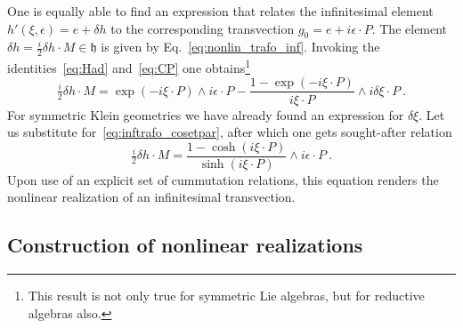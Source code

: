 \documentclass[11pt]{article}
\begin{document}
One is equally able to find an expression that relates the 
infinitesimal element $h'(\xi,\epsilon) = e + \delta h$ to the
corresponding transvection $g_0 = e + i\epsilon\cdot P$. The 
element $\delta h = \tfrac{i}{2} \delta h \cdot M \in 
\mathfrak{h}$ is given by Eq.~\eqref{eq:nonlin_trafo_inf}.  
Invoking the identities~\eqref{eq:Had} and~\eqref{eq:CP} one 
obtains\footnote{This result is not only true for symmetric Lie 
	algebras, but for reductive algebras also.}
\begin{equation}
	\tfrac{i}{2} \delta h \cdot M = \exp(-i\xi\cdot P) \wedge 
	i\epsilon\cdot P - \frac{1-\exp(-i\xi\cdot P)}{i\xi\cdot P} 
	\wedge i\delta\xi \cdot P~.
\end{equation}
For symmetric Klein geometries we have already found an 
expression for $\delta\xi$. Let us substitute 
for~\eqref{eq:inftrafo_cosetpar}, after which one gets 
sought-after relation
\begin{equation}\label{eq:inftrafo_h}
	\tfrac{i}{2}\delta h \cdot M = \frac{1-\cosh(i\xi\cdot 
		P)}{\sinh(i\xi\cdot P)} \wedge i\epsilon\cdot P~.
\end{equation}
Upon use of an explicit set of cummutation relations, this 
equation renders the nonlinear realization of an infinitesimal 
transvection.


\subsection{Construction of nonlinear realizations}
\label{ssec:lin_to_nonlin}
\end{document}
